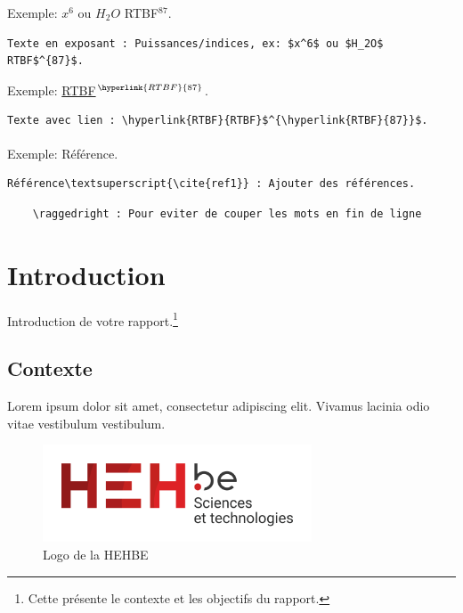 Exemple: $x^6$ ou $H_2O$ RTBF$^{87}$.
\begin{verbatim}
Texte en exposant : Puissances/indices, ex: $x^6$ ou $H_2O$ RTBF$^{87}$.
\end{verbatim}

Exemple: \hyperlink{RTBF}{RTBF}$^{\hyperlink{RTBF}{87}}$.
\begin{verbatim}
Texte avec lien : \hyperlink{RTBF}{RTBF}$^{\hyperlink{RTBF}{87}}$.
\end{verbatim}

Exemple: Référence\textsuperscript{\cite{ref1}}.
\begin{verbatim}
Référence\textsuperscript{\cite{ref1}} : Ajouter des références.
\end{verbatim}

\begin{verbatim}
    \raggedright : Pour eviter de couper les mots en fin de ligne
\end{verbatim}


\chapter{Introduction}
Introduction de votre rapport.\footnote{Cette présente le contexte et les objectifs du rapport.}

\section{Contexte}
Lorem ipsum dolor sit amet, consectetur adipiscing elit. Vivamus lacinia odio vitae vestibulum vestibulum.

\begin{figure}[!ht]
    \centering
    \includegraphics[width=8cm]{img/logo_hehbe_tech.png}
    \caption{Logo de la HEHBE}
    \label{fig:example_figure}
\end{figure}

